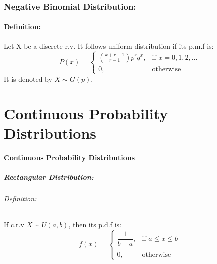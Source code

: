 \documentclass[
10pt, %
a4paper, %
]{report}
\begin{document}
\newpage

\section*{Negative Binomial Distribution:}
\subsection*{Definition:}
Let X be a discrete r.v. It follows uniform distribution if its p.m.f is:
\[
    P(x)= 
\begin{cases}
    \binom{k+r-1}{r-1} p^r q^x,    & \text{if } x = 0, 1, 2, \dots\\
    0,              & \text{otherwise}
\end{cases}
\]
It is denoted by \(X \sim G(p).\) 

\part{Continuous Probability Distributions}

\subsection*{Continuous Probability Distributions}
\subsubsection*{Rectangular Distribution:}
\paragraph*{Definition:}
If c.r.v \(X\sim U(a, b)\), then its p.d.f is:
\[
    f(x)= 
\begin{cases}
    \dfrac{1}{b-a},        & \text{if } a\leq x \leq b\\ \\
    0,                    & \text{otherwise}
\end{cases}
\]
\end{document}

